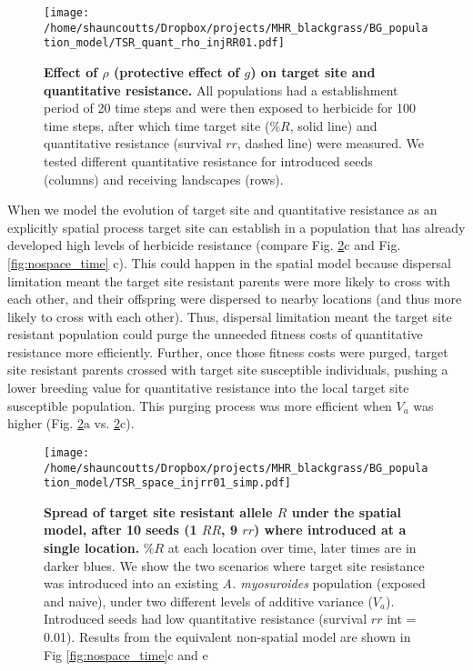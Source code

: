\documentclass[10pt,letterpaper]{article}
\begin{document}
\begin{figure}[!h] 
	\texttt{[image: /home/shauncoutts/Dropbox/projects/MHR\_blackgrass/BG\_population\_model/TSR\_quant\_rho\_injRR01.pdf]}
\caption{{\bf Effect of $\rho$ (protective effect of $g$) on target site and quantitative resistance.} All populations had a establishment period of 20 time steps and were then exposed to herbicide for 100 time steps, after which time target site ($\%R$, solid line) and quantitative resistance (survival $rr$, dashed line) were measured. We tested different quantitative resistance for introduced seeds (columns) and receiving landscapes (rows).}        
\label{fig:gpro}
\end{figure}

When we model the evolution of target site and quantitative resistance as an explicitly spatial process target site can establish in a population that has already developed high levels of herbicide resistance (compare Fig. \ref{fig:pro_R_spr}c and Fig. \ref{fig:nospace_time} c). This could happen in the spatial model because dispersal limitation meant the target site resistant parents were more likely to cross with each other, and their offspring were dispersed to nearby locations (and thus more likely to cross with each other). Thus, dispersal limitation meant the target site resistant population could purge the unneeded fitness costs of quantitative resistance more efficiently. Further, once those fitness costs were purged, target site resistant parents crossed with target site susceptible individuals, pushing a lower breeding value for quantitative resistance into the local target site susceptible population. This purging process was more efficient when $V_a$ was higher (Fig. \ref{fig:pro_R_spr}a vs. \ref{fig:pro_R_spr}c).

\begin{figure}[!h] 
	\texttt{[image: /home/shauncoutts/Dropbox/projects/MHR\_blackgrass/BG\_population\_model/TSR\_space\_injrr01\_simp.pdf]}
\caption{{\bf Spread of target site resistant allele $R$ under the spatial model, after 10 seeds (1 $RR$, 9 $rr$) where introduced at a single location.} $\%R$ at each location over time, later times are in darker blues. We show the two scenarios where target site resistance was introduced into an existing \textit{A. myosuroides} population (exposed and naive), under two different levels of additive variance ($V_a$). Introduced seeds had low quantitative resistance (survival $rr$ int = 0.01). Results from the equivalent non-spatial model are shown in Fig \ref{fig:nospace_time}c and e} 
\label{fig:pro_R_spr}
\end{figure}
\end{document}

